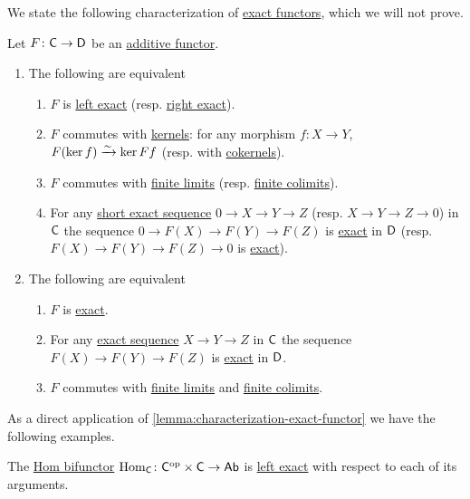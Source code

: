 \documentclass[../../main]{subfiles}
\begin{document}
We state the following characterization of \hyperref[def:exact-functor]{exact functors}, which we will not prove.
\begin{lemma}\label{lemma:characterization-exact-functor}
  Let \(F\colon \mathsf{C} \to \mathsf{D}\) be an \hyperref[def:additive-functor]{additive functor}.
  \begin{enumerate}
    \item The following are equivalent
          \begin{enumerate}
            \item \(F\) is \hyperref[def:exact-functor]{left exact} (resp. \hyperref[def:exact-functor]{right exact}).
            \item \(F\) commutes with \hyperref[def:categorical-kernel]{kernels}: for any morphism \(f\colon X \to Y\), \(F(\ker f) \xrightarrow{\sim} \ker Ff\) (resp. with \hyperref[def:categorical-cokernel]{cokernels}).
            \item \(F\) commutes with \hyperref[def:categorical-limit]{finite limits} (resp. \hyperref[def:categorical-colimit]{finite colimits}).
            \item For any \hyperref[def:exact-sequence]{short exact sequence} \(0 \to X \to Y \to Z\) (resp. \(X \to Y \to Z \to 0\)) in \(\mathsf{C}\) the sequence \(0 \to F(X) \to F(Y) \to F(Z)\) is \hyperref[def:exact-sequence]{exact} in \(\mathsf{D}\) (resp. \(F(X) \to F(Y) \to F(Z) \to 0\) is \hyperref[def:exact-sequence]{exact}).
          \end{enumerate}
    \item  The following are equivalent
          \begin{enumerate}
            \item \(F\) is \hyperref[def:exact-functor]{exact}.
            \item For any \hyperref[def:exact-sequence]{exact sequence} \(X \to Y \to Z\) in \(\mathsf{C}\) the sequence \(F(X) \to F(Y) \to F(Z)\) is \hyperref[def:exact-sequence]{exact} in \(\mathsf{D}\).
            \item \(F\) commutes with \hyperref[def:categorical-colimit]{finite limits} and \hyperref[def:categorical-colimit]{finite colimits}.
          \end{enumerate}
  \end{enumerate}
\end{lemma}

As a direct application of \autoref{lemma:characterization-exact-functor} we have the following examples.
\begin{example}\label{ex:hom-left-exact}
  The \hyperref[ex:hom-functor]{Hom bifunctor} \(\operatorname{Hom}_{\mathsf{C}}\colon \mathsf{C}^{\operatorname*{op}} \times \mathsf{C} \to \mathsf{Ab}\) is \hyperref[def:exact-functor]{left exact} with respect to each of its arguments.
\end{example}
\end{document}

